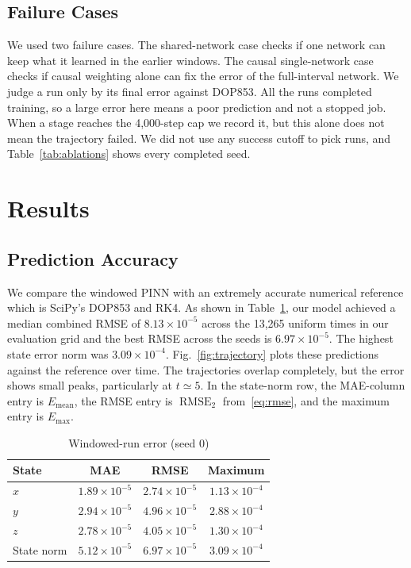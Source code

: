 \documentclass[conference,a4paper]{IEEEtran}
\begin{document}
\subsection{Failure Cases}
We used two failure cases. The shared-network case checks if one network can keep what it learned in the earlier windows. The causal single-network case checks if causal weighting alone can fix the error of the full-interval network. We judge a run only by its final error against DOP853. All the runs completed training, so a large error here means a poor prediction and not a stopped job. When a stage reaches the 4,000-step cap we record it, but this alone does not mean the trajectory failed. We did not use any success cutoff to pick runs, and Table~\ref{tab:ablations} shows every completed seed.


\section{Results}
\label{sec:results}



\subsection{Prediction Accuracy}
We compare the windowed PINN with an extremely accurate numerical reference which is SciPy's DOP853 and RK4. As shown in Table~\ref{tab:errors}, our model achieved a median combined RMSE of $8.13\times10^{-5}$ across the 13,265 uniform times in our evaluation grid and the best RMSE across the seeds is $6.97\times10^{-5}$. The highest state error norm was $3.09\times10^{-4}$. Fig.~\ref{fig:trajectory} plots these predictions against the reference over time. The trajectories overlap completely, but the error shows small peaks, particularly at $t\simeq5$. In the state-norm row, the MAE-column entry is $E_{\mathrm{mean}}$, the RMSE entry is $\operatorname{RMSE}_2$ from~\eqref{eq:rmse}, and the maximum entry is $E_{\mathrm{max}}$.

\begin{table}[t]
\caption{Windowed-run error (seed 0)}
\label{tab:errors}
\centering\footnotesize
\begin{tabular}{lccc}
\toprule
State & MAE & RMSE & Maximum\\
\midrule
$x$ & $1.89\times10^{-5}$ & $2.74\times10^{-5}$ & $1.13\times10^{-4}$\\
$y$ & $2.94\times10^{-5}$ & $4.96\times10^{-5}$ & $2.88\times10^{-4}$\\
$z$ & $2.78\times10^{-5}$ & $4.05\times10^{-5}$ & $1.30\times10^{-4}$\\
State norm & $5.12\times10^{-5}$ & $6.97\times10^{-5}$ & $3.09\times10^{-4}$\\
\bottomrule
\end{tabular}
\end{table}
\end{document}
